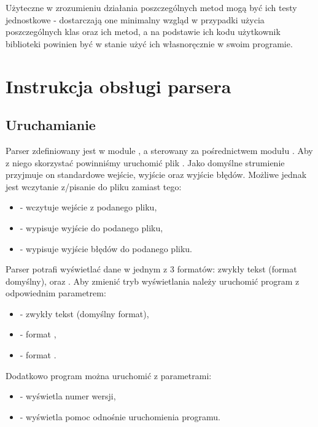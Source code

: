 \documentclass[polish]{standalone}
\begin{document}
Użyteczne w zrozumieniu działania poszczególnych metod mogą być ich testy jednostkowe - dostarczają one minimalny wzgląd
w przypadki użycia poszczególnych klas oraz ich metod, a na podstawie ich kodu użytkownik biblioteki powinien być w
stanie użyć ich własnoręcznie w swoim programie.

\chapter{Instrukcja obsługi parsera}

\section{Uruchamianie}

Parser zdefiniowany jest w module , a sterowany za pośrednictwem modułu . Aby z niego skorzystać
powinniśmy uruchomić plik . Jako domyślne strumienie przyjmuje on standardowe wejście, wyjście
oraz wyjście błędów. Możliwe jednak jest wczytanie z/pisanie do pliku zamiast tego:
\begin{itemize}
\item {} - wczytuje wejście z podanego pliku,
\item {} - wypisuje wyjście do podanego pliku,
\item {} - wypisuje wyjście błędów do podanego pliku.
\end{itemize}

Parser potrafi wyświetlać dane w jednym z 3 formatów: zwykły tekst (format domyślny),  oraz . Aby
zmienić tryb wyświetlania należy uruchomić program z odpowiednim parametrem:
\begin{itemize}
\item {} - zwykły tekst (domyślny format),
\item {} - format ,
\item {} - format .
\end{itemize}

Dodatkowo program można uruchomić z parametrami:
\begin{itemize}
\item {} - wyświetla numer wersji,
\item {} - wyświetla pomoc odnośnie uruchomienia programu.
\end{itemize}
\end{document}
